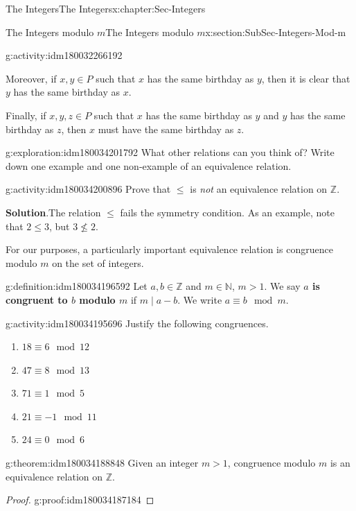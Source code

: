 \documentclass[oneside,10pt,]{book}
\newcommand{\blocktitlefont}{\relax}
\newcommand{\terminology}[1]{\textbf{#1}}
\numberwithin{equation}{section}
\renewcommand{\le}{\leqslant}
\def\Z{{\mathbb Z}}
\def\N{{\mathbb N}}
\begin{document}
\begin{chapterptx}{The Integers}{}{The Integers}{}{}{x:chapter:Sec-Integers}
\begin{sectionptx}{The Integers modulo \(m\)}{}{The Integers modulo \(m\)}{}{}{x:section:SubSec-Integers-Mod-m}
\begin{activity}{}{g:activity:idm180032266192}
\par
Moreover, if \(x,y\in P\) such that \(x\) has the same birthday as \(y\), then it is clear that \(y\) has the same birthday as \(x\).%
\par
Finally, if \(x,y,z\in P\) such that \(x\) has the same birthday as \(y\) and \(y\) has the same birthday as \(z\), then \(x\) must have the same birthday as \(z\).%
\end{activity}
\begin{exploration}{}{g:exploration:idm180034201792}%
What other relations can you think of? Write down one example and one non-example of an equivalence relation.%
\end{exploration}
\begin{activity}{}{g:activity:idm180034200896}%
Prove that \(\le\) is \emph{not} an equivalence relation on \(\Z\).%
\par\smallskip%
\noindent\textbf{\blocktitlefont Solution}.\hypertarget{g:solution:idm180034199088}{}\quad{}The relation \(\le\) fails the symmetry condition. As an example, note that \(2 \le 3\), but \(3\not\le 2\).%
\end{activity}
For our purposes, a particularly important equivalence relation is congruence modulo \(m\) on the set of integers.%
\begin{definition}{}{g:definition:idm180034196592}%
%
Let \(a,b\in \Z\) and \(m \in \N\), \(m > 1\). We say \terminology{\(a\) is congruent to \(b\) modulo \(m\)} if \(m\mid a-b\). We write \(a \equiv b\mod m\).%
\end{definition}
\begin{activity}{}{g:activity:idm180034195696}%
Justify the following congruences.%
\begin{enumerate}
\item{}\(\displaystyle 18 \equiv 6\mod 12\)%
\item{}\(\displaystyle 47 \equiv 8\mod 13\)%
\item{}\(\displaystyle 71 \equiv 1\mod 5\)%
\item{}\(\displaystyle 21 \equiv -1 \mod 11\)%
\item{}\(\displaystyle 24 \equiv 0\mod 6\)%
\end{enumerate}
%
\end{activity}
\begin{theorem}{}{}{g:theorem:idm180034188848}%
Given an integer \(m > 1\), congruence modulo \(m\) is an equivalence relation on \(\Z\).%
\end{theorem}
\begin{proof}{}{g:proof:idm180034187184}

\end{proof}
\end{sectionptx}
\end{chapterptx}
\end{document}
